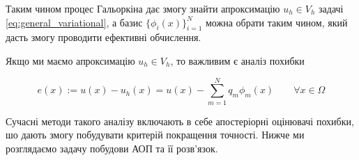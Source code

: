 Таким чином процес Гальоркіна дає змогу знайти апроксимацію $u_h \in V_h$ задачі
\eqref{eq:general_variational},
	а базис $\lbrace \phi_i(x)\rbrace_{i=1}^N$ можна обрати таким чином, який дасть змогу проводити ефективні обчислення.


Якщо ми маємо апроксимацію $u_h \in V_h$, то важливим є аналіз похибки

\begin{equation}
	e(x) := u(x) - u_h(x) = u(x) - \sum\limits_{m=1}^N q_m \phi_m (x) \qquad \forall x \in \Omega
\end{equation}

Сучасні методи такого аналізу включають в себе апостеріорні оцінювачі похибки, шо дають змогу побудувати критерій покращення точності.
Нижче ми розглядаємо задачу побудови АОП та її розв'язок.
